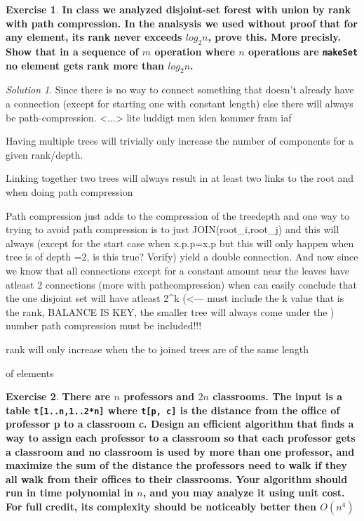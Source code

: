 \documentclass[a4paper,twoside=false,abstract=false,numbers=noenddot,
titlepage=false,headings=small,parskip=half,version=last]{scrartcl}
\theoremstyle{definition}
\newtheorem{exercise}{Exercise}
\theoremstyle{remark}
\newtheorem*{solution}{Solution}
\begin{document}
\begin{exercise}
{\bf
In class we analyzed disjoint-set forest with union by rank with path compression.
In the analsysis we used without proof that for any element, its rank never
exceeds $log_2n$, prove this. More precisly.
Show that in a sequence of $m$ operation where $n$ operations are
\verb+makeSet+ no element gets rank more than $log_2n$.
}
\end{exercise}
\begin{solution}

Since there is no way to connect something that doesn't already have a
connection (except for starting one with constant length) else there will
always be path-compression. <...> lite luddigt men iden kommer fram iaf

Having multiple trees will trivially only increase the number of components for
a given rank/depth.

Linking together two trees will always result in at least two links to the root
and when doing path compression

Path compression just adds to the compression of the treedepth and one way to
trying to avoid path compression is to just JOIN(root_i,root_j)
and this will always (except for the start case when x.p.p=x.p but this will
only happen when tree is of depth =2, is this true? Verify) yield a double
connection. And now since we know that all connections except for a constant
amount near the leaves have atleast 2 connections (more with pathcompression)
when can easily conclude that the one disjoint set will have atleast 2^k (<---
must include the k value that is the rank, BALANCE IS KEY, the smaller tree
will always come under the ) number
path compression must be included!!!

rank will only increase when the to joined trees are of the same length


of elements

\end{solution}
\begin{exercise}
{\bf
There are $n$ professors and $2n$ classrooms. The input is a table \verb+t[1..n,1..2*n]+ where \verb+t[p, c]+ is the distance from the office of professor p to a classroom c.
Design an efficient algorithm that finds a way to assign each professor to a classroom so that each professor gets a classroom and no classroom is used by more than one professor, and maximize the sum of the distance the professors need to walk if they all walk from their offices to their classrooms.
Your algorithm should run in time polynomial in $n$, and you may analyze it using unit cost.
For full credit, its complexity should be noticeably better then $O(n^4)$
}
\end{exercise}
\end{document}
